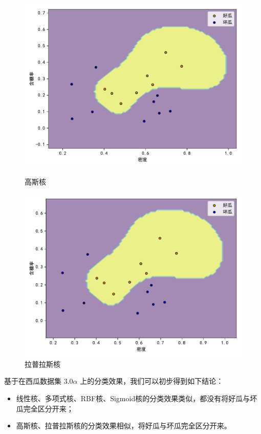 \documentclass{ctexart}
\begin{document}
\begin{figure}[!htb]
		\begin{minipage}{0.49\linewidth}
			\centering
			\includegraphics[width=\textwidth]{../image/高斯核.pdf}
			\caption{高斯核}
			\label{gauss}
		\end{minipage}
		\begin{minipage}{0.49\linewidth}
			\centering
			\includegraphics[width=\textwidth]{../image/拉普拉斯核.pdf}
			\caption{拉普拉斯核}
			\label{laplace}
		\end{minipage}
	\end{figure}

	基于在西瓜数据集 $3.0\alpha$ 上的分类效果，我们可以初步得到如下结论：
	
	\begin{itemize}
		\item 线性核、多项式核、RBF核、Sigmoid核的分类效果类似，都没有将好瓜与坏瓜完全区分开来；
		\item 高斯核、拉普拉斯核的分类效果相似，将好瓜与坏瓜完全区分开来。
	\end{itemize}
	
\end{document}

